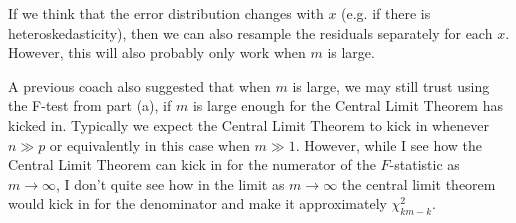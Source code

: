 \begin{itemize}
If we think that the error distribution changes with $x$ (e.g. if there is heteroskedasticity), then we can also resample the residuals separately for each $x$. However, this will also probably only work when $m$ is large.

A previous coach also suggested that when $m$ is large, we may still trust using the F-test from part (a), if $m$ is large enough for the Central Limit Theorem has kicked in. Typically we expect the Central Limit Theorem to kick in whenever $n \gg p$ or equivalently in this case when $m \gg 1$. However, while I see how the Central Limit Theorem can kick in for the numerator of the $F$-statistic as $m \to \infty$, I don't quite see how in the limit as $m \to \infty$ the central limit theorem would kick in for the denominator and make it approximately $\chi_{km-k}^2$.


\end{itemize}
